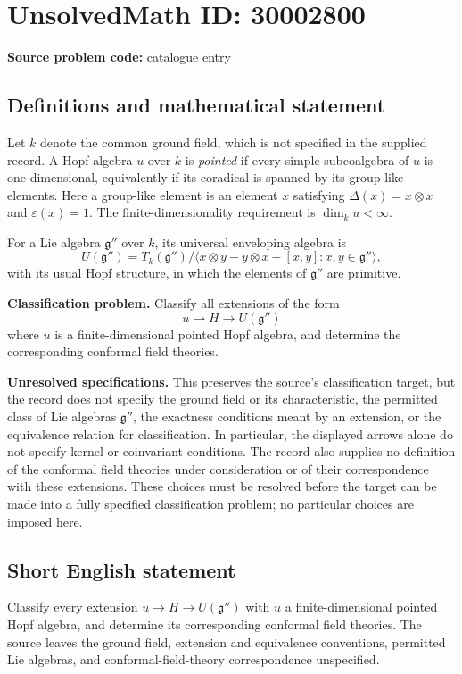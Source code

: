 \documentclass[11pt]{article}
\begin{document}
\section*{UnsolvedMath ID: 30002800}
\textbf{Source problem code:} catalogue entry
\subsection{Definitions and mathematical statement}
Let \(k\) denote the common ground field, which is not specified in the supplied record. A Hopf algebra \(u\) over \(k\) is \emph{pointed} if every simple subcoalgebra of \(u\) is one-dimensional, equivalently if its coradical is spanned by its group-like elements. Here a group-like element is an element \(x\) satisfying \(\Delta(x)=x\otimes x\) and \(\varepsilon(x)=1\). The finite-dimensionality requirement is \(\dim_k u<\infty\).

For a Lie algebra \(\mathfrak g''\) over \(k\), its universal enveloping algebra is
\[
U(\mathfrak g'')=T_k(\mathfrak g'')/\langle x\otimes y-y\otimes x-[x,y]:x,y\in\mathfrak g''\rangle,
\]
with its usual Hopf structure, in which the elements of \(\mathfrak g''\) are primitive.

\textbf{Classification problem.} Classify all extensions of the form
\[
u\longrightarrow H\longrightarrow U(\mathfrak g'')
\]
where \(u\) is a finite-dimensional pointed Hopf algebra, and determine the corresponding conformal field theories.

\textbf{Unresolved specifications.} This preserves the source's classification target, but the record does not specify the ground field or its characteristic, the permitted class of Lie algebras \(\mathfrak g''\), the exactness conditions meant by an extension, or the equivalence relation for classification. In particular, the displayed arrows alone do not specify kernel or coinvariant conditions. The record also supplies no definition of the conformal field theories under consideration or of their correspondence with these extensions. These choices must be resolved before the target can be made into a fully specified classification problem; no particular choices are imposed here.
\subsection{Short English statement}
Classify every extension \(u\longrightarrow H\longrightarrow U(\mathfrak g'')\) with \(u\) a finite-dimensional pointed Hopf algebra, and determine its corresponding conformal field theories. The source leaves the ground field, extension and equivalence conventions, permitted Lie algebras, and conformal-field-theory correspondence unspecified.
\end{document}

